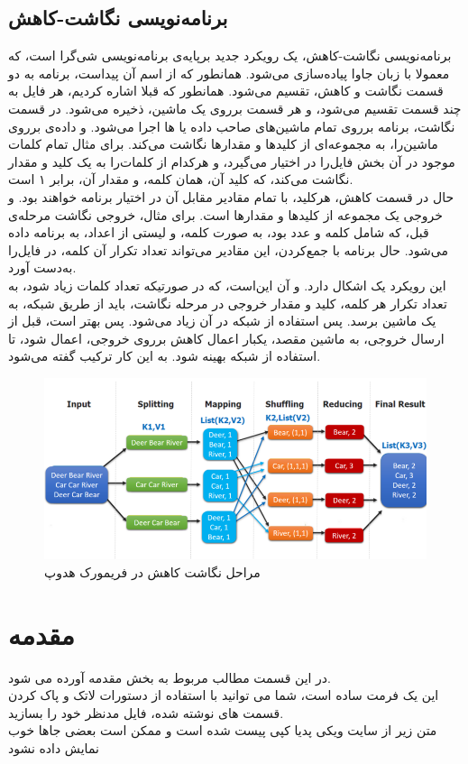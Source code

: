 \documentclass[12pt,onecolumn,a4paper]{article}
\begin{document}
\subsection{برنامه‌نویسی نگاشت-کاهش}
برنامه‌نویسی نگاشت-کاهش، یک رویکرد جدید برپایه‌ی برنامه‌نویسی شی‌گرا است، که معمولا با زبان جاوا پیاده‌سازی می‌شود. همانطور که از اسم آن پیداست، برنامه به دو قسمت نگاشت و کاهش، تقسیم می‌شود.
همانطور که قبلا اشاره کردیم، هر فایل به چند قسمت تقسیم می‌شود، و هر قسمت برروی یک ماشین، ذخیره می‌شود. در قسمت نگاشت، برنامه برروی تمام ماشین‌های صاحب داده یا ها اجرا می‌شود. و داده‌ی برروی ماشین‌را،
به مجموعه‌ای از کلیدها و مقدارها نگاشت می‌کند. برای مثال تمام کلمات موجود در آن بخش فایل‌را در اختیار می‌گیرد، و هرکدام از کلمات‌را به یک کلید و مقدار نگاشت می‌کند، که کلید آن، همان کلمه، و مقدار آن، برابر ۱ است. \\
حال در قسمت کاهش، هرکلید، با تمام مقادیر مقابل آن در اختیار برنامه خواهند بود. و خروجی یک مجموعه از کلیدها و مقدارها است. برای مثال، خروجی نگاشت مرحله‌ی قبل، که شامل کلمه و عدد بود، به صورت کلمه، و لیستی از اعداد، به برنامه داده می‌شود.
حال برنامه با جمع‌کردن، این مقادیر می‌تواند تعداد تکرار آن کلمه، در فایل‌را به‌دست آورد. \\
این رویکرد یک اشکال دارد. و آن این‌است، که در صورتیکه تعداد کلمات زیاد شود، به تعداد تکرار هر کلمه، کلید و مقدار خروجی در مرحله نگاشت، باید از طریق شبکه، به یک ماشین برسد. پس استفاده از شبکه در آن زیاد می‌شود.
پس بهتر است، قبل از ارسال خروجی، به ماشین مقصد، یکبار اعمال کاهش برروی خروجی، اعمال شود، تا استفاده از شبکه بهینه شود. به این کار ترکیب گفته می‌شود.

\begin{figure}[h!]
\centering
        \includegraphics[width=1.0\textwidth]{hadoop-mapreduce.png}
        \caption{مراحل نگاشت کاهش در فریمورک هدوپ}
\end{figure}

\section{مقدمه} 
در این قسمت مطالب مربوط به بخش مقدمه آورده می شود.\\
این یک فرمت ساده است، شما می توانید با استفاده از دستورات لاتک و پاک کردن قسمت های نوشته شده، فایل مدنظر خود را بسازید.\\
متن زیر از سایت ویکی پدیا کپی پیست شده است و ممکن است بعضی جاها خوب نمایش داده نشود
\end{document}
